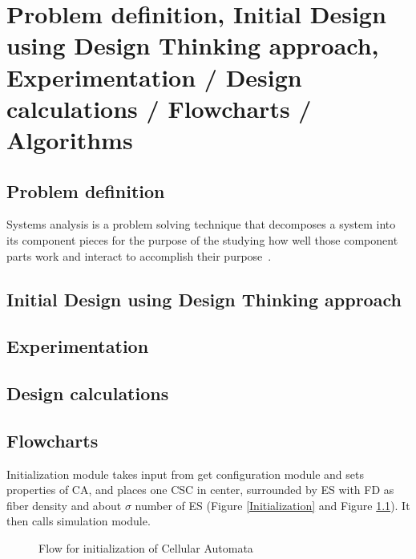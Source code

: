 \chapter{ Problem definition, Initial Design using Design Thinking approach, Experimentation / Design calculations / Flowcharts / Algorithms }
\section{Problem definition}
Systems analysis is a problem solving technique that decomposes a system into its component pieces 
for the purpose of the studying how well those component parts work and interact to accomplish their purpose~\cite{SystemsAnalysisandDesign}.
\lipsum[1-1]

\section{Initial Design using Design Thinking approach}
\lipsum[2-2]

\section{Experimentation}
\lipsum[3-3]

\section{Design calculations}
\lipsum[4-4]

\section{Flowcharts}
Initialization module takes input from get configuration module and sets properties of CA, and places one CSC in center, 
surrounded by ES with FD as fiber density and about $\sigma$ number of ES (Figure \ref{Initialization} and 
Figure \ref{InitializationFlowChart}).
It then calls simulation module.
  
  \begin{figure}[H]
	  \centering
	  \caption{Flow for initialization of Cellular Automata}	
	  \label{InitializationFlowChart}
  \end{figure}   

